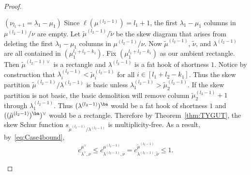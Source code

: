 \begin{proof}
\begin{Case}
\begin{figure}[htb]
 \caption[Case 4]{}
 
\end{figure}

\end{Case}

\begin{Case}
{ $(\nu_{l_1+1} = \lambda_1-\mu_1)$} 
Since $\ell(\mu^{(l_2-1)}) = l_1+1$, the first $\lambda_1-\mu_1$ columns in $\mu^{(l_2-1)}/\nu$ are empty. Let $\widetilde \mu^{(l_2-1)}/\widetilde \nu$ be the skew diagram that arises from deleting the first $\lambda_1-\mu_1$ columns in $\mu^{(l_2-1)}/\nu$. Now $\widetilde \mu^{(l_2-1)}$, $\widetilde \nu$, and $\lambda^{(l_2-1)}$ are all contained in $(\mu_1^{l_1+l_2-k_1})$. Fix $(\mu_1^{l_1+l_2-k_1})$ as our ambient rectangle. Then $\widetilde \mu^{(l_2-1)\vee}$ is a rectangle and $\lambda^{(l_2-1)}$ is a fat hook of shortness $1$. Notice by construction that $\lambda^{(l_2-1)}_{i}< \tilde\mu^{(l_2-1)}_i$ for all $i\in [l_1+l_2-k_1]$. Thus the skew partition $\tilde\mu^{(l_2-1)}/\lambda^{(l_2-1)}$ is basic unless $\lambda^{(l_2-1)}_1> \tilde\mu^{(l_2-1)}_2$. If the skew partition is not basic, the basic demolition will remove column $\tilde\mu^{(l_2-1)}_2+1$ through $\lambda^{(l_2-1)}_1$. Thus $(\lambda^{(l_2-1)})^{\ba }$ would be a fat hook of shortness $1$ and $((\tilde\mu^{(l_2-1)})^{\ba })^\vee$ would be a rectangle. Therefore by Theorem~\ref{thm:TYGUT}, the skew Schur function $s_{\widetilde \mu^{(l_2-1)}/\lambda^{(l_2-1)}}$ is multiplicity-free. As a result, by~\eqref{eq:Case4bound},
\[
c^{\mu^\vee}_{\lambda^\vee,\nu}\leq c^{\mu^{(l_2-1)}}_{\lambda^{(l_2-1)},\nu} = c^{\widetilde \mu^{(l_2-1)}}_{\lambda^{(l_2-1)},\tilde \nu} \leq 1.
\]
\end{Case}


\end{proof}
